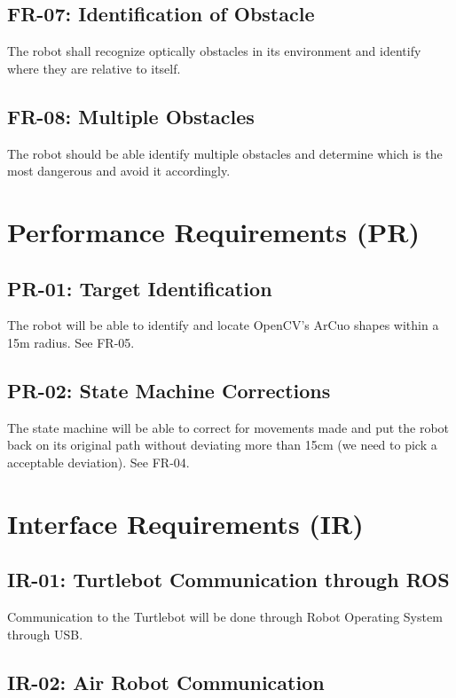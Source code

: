 \documentclass[]{report}
\begin{document}
\subsection{FR-07: Identification of Obstacle}
The robot shall recognize optically obstacles in its environment and identify where they are relative to itself.

\subsection{FR-08: Multiple Obstacles}
The robot should be able identify multiple obstacles and determine which is the most dangerous and avoid it accordingly. 


\section{Performance Requirements (PR)}

\subsection{PR-01: Target Identification}
The robot will be able to identify and locate OpenCV's ArCuo shapes within a 15m radius. See FR-05.

\subsection{PR-02: State Machine Corrections}
The state machine will be able to correct for movements made and put the robot back on its original path without deviating more than 15cm (we need to pick a acceptable deviation). See FR-04.


\section{Interface Requirements (IR)}

\subsection{IR-01: Turtlebot Communication through ROS}

Communication to the Turtlebot will be done through Robot Operating System through USB.

\subsection{IR-02: Air Robot Communication}
\end{document}
